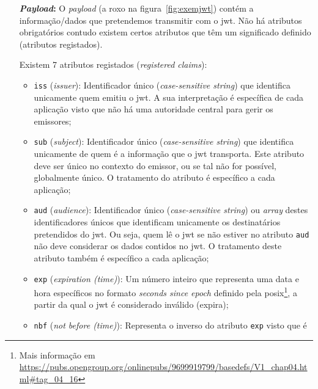 \begin{itemize}
    \begin{lstlisting}[language=json, caption=\textit{Header} usado para construir o \acrshort{jwt} da figura~\ref{fig:exemjwt}]
    {
        "alg": "HS256",
        "typ": "JWT"
    }
    \end{lstlisting}

    \item [\textbf{\textit{Payload}:}] O \textit{payload} (a roxo na figura~\ref{fig:exemjwt}) contém a 
    informação/dados que pretendemos transmitir com o \acrshort{jwt}. Não há atributos obrigatórios contudo 
    existem certos atributos que têm um significado definido (atributos registados).

    Existem 7 atributos registados (\textit{registered claims}):~\cite{jwthandbook}
    \begin{itemize}
        \item \texttt{iss} (\textit{issuer}): Identificador único (\textit{case-sensitive string}) que identifica 
        unicamente quem emitiu o \acrshort{jwt}. A sua interpretação é específica de cada aplicação visto que não há 
        uma autoridade central para gerir os emissores;
        \item \texttt{sub} (\textit{subject}): Identificador único (\textit{case-sensitive string}) que identifica 
        unicamente de quem é a informação que o \acrshort{jwt} transporta. Este atributo deve ser único no contexto 
        do emissor, ou se tal não for possível, globalmente único. O tratamento do atributo é específico a cada 
        aplicação;
        \item \texttt{aud} (\textit{audience}): Identificador único (\textit{case-sensitive string}) ou 
        \textit{array} destes identificadores únicos que identificam unicamente os destinatários pretendidos do 
        \acrshort{jwt}. Ou seja, quem lê o \acrshort{jwt} se não estiver no atributo \texttt{aud} não deve considerar 
        os dados contidos no \acrshort{jwt}. O tratamento deste atributo também é específico a cada aplicação; 
        \item \texttt{exp} (\textit{expiration (time)}): Um número inteiro que representa uma data e hora específicos 
        no formato \textit{seconds since epoch} definido pela 
        \acrshort{posix}\footnote{Mais informação em \url{https://pubs.opengroup.org/onlinepubs/9699919799/basedefs/V1\_chap04.html\#tag\_04\_16}}, 
        a partir da qual o \acrshort{jwt} é considerado inválido (expira);
        \item \texttt{nbf} (\textit{not before (time)}): Representa o inverso do atributo \texttt{exp} visto que é 

\end{itemize}
\end{itemize}
